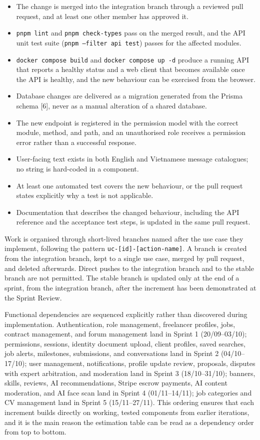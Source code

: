 \begin{itemize}
\item The change is merged into the integration branch through a reviewed pull request, and at least one other member has approved it.
\item \texttt{pnpm lint} and \texttt{pnpm check-types} pass on the merged result, and the API unit test suite (\texttt{pnpm --filter api test}) passes for the affected modules.
\item \texttt{docker compose build} and \texttt{docker compose up -d} produce a running API that reports a healthy status and a web client that becomes available once the API is healthy, and the new behaviour can be exercised from the browser.
\item Database changes are delivered as a migration generated from the Prisma schema [6], never as a manual alteration of a shared database.
\item The new endpoint is registered in the permission model with the correct module, method, and path, and an unauthorised role receives a permission error rather than a successful response.
\item User-facing text exists in both English and Vietnamese message catalogues; no string is hard-coded in a component.
\item At least one automated test covers the new behaviour, or the pull request states explicitly why a test is not applicable.
\item Documentation that describes the changed behaviour, including the API reference and the acceptance test steps, is updated in the same pull request.
\end{itemize}

Work is organised through short-lived branches named after the use case they implement, following the pattern \texttt{uc-[id]-[action-name]}. A branch is created from the integration branch, kept to a single use case, merged by pull request, and deleted afterwards. Direct pushes to the integration branch and to the stable branch are not permitted. The stable branch is updated only at the end of a sprint, from the integration branch, after the increment has been demonstrated at the Sprint Review.

Functional dependencies are sequenced explicitly rather than discovered during implementation. Authentication, role management, freelancer profiles, jobs, contract management, and forum management land in Sprint 1 (20/09--03/10); permissions, sessions, identity document upload, client profiles, saved searches, job alerts, milestones, submissions, and conversations land in Sprint 2 (04/10--17/10); user management, notifications, profile update review, proposals, disputes with expert arbitration, and moderation land in Sprint 3 (18/10--31/10); banners, skills, reviews, AI recommendations, Stripe escrow payments, AI content moderation, and AI face scan land in Sprint 4 (01/11--14/11); job categories and CV management land in Sprint 5 (15/11--27/11). This ordering ensures that each increment builds directly on working, tested components from earlier iterations, and it is the main reason the estimation table can be read as a dependency order from top to bottom.

